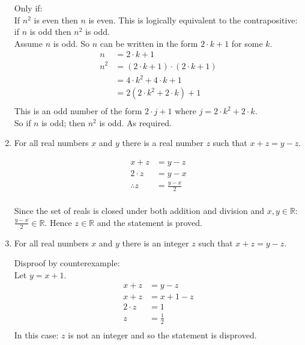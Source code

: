 \documentclass[10pt,\jkfside,a4paper]{article}
\begin{document}
\begin{enumerate}
Only if:\\
If $n^2$ is even then $n$ is even. This is logically equivalent to the 
contrapositive: if $n$ is odd then $n^2$ is odd.\\
Assume $n$ is odd. So $n$ can be written in the form $2\cdot k + 1$ for some $k$.
\begin{equation}
\begin{split}
n &= 2\cdot k + 1\\
n^2 &= (2\cdot k + 1)\cdot(2\cdot k + 1)\\
&= 4\cdot k^2 + 4\cdot k + 1\\
&= 2(2\cdot k^2 + 2\cdot k) + 1\\
\end{split}
\end{equation}
This is an odd number of the form $2\cdot j + 1$ where $j=2\cdot k^2 + 2\cdot k$.\\
So if $n$ is odd; then $n^2$ is odd. As required.

\item For all real numbers $x$ and $y$ there is a real number $z$ such that 
$x + z = y - z$.

\begin{equation}
\begin{split}
x + z &= y - z\\
2\cdot z &= y - x\\
\therefore z &= \frac{y - x}{2}\\
\end{split}
\end{equation}

Since the set of reals is closed under both addition and division and $x, y \in \mathbb{R}$: $\frac{y - x}{2}\in\mathbb{R}$. 
Hence $z\in\mathbb{R}$ and the statement is proved.

\item For all real numbers $x$ and $y$ there is an integer $z$ such that 
$x + z = y - z$.

Disproof by counterexample:\\
Let $y = x + 1$.
\begin{equation}
\begin{split}
x + z &= y - z\\
x + z &= x + 1 - z\\
2\cdot z &= 1\\
z &= \frac{1}{2}\\
\end{split}
\end{equation}
In this case: $z$ is not an integer and so the statement is disproved.


\end{enumerate}
\end{document}
